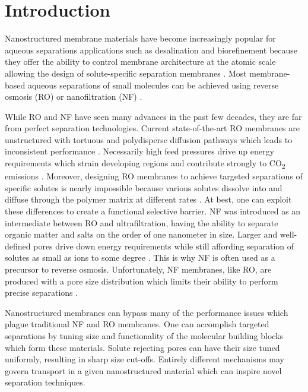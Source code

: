 \section*{Introduction}

Nanostructured membrane materials have become increasingly popular for 
aqueous separations applications such as desalination and biorefinement
because they offer the ability to control membrane architecture at the
atomic scale allowing the design of solute-specific separation membranes 
\cite{humplik_nanostructured_2011}. Most membrane-based aqueous 
separations of small molecules can be achieved using reverse osmosis 
(RO) or nanofiltration (NF) \cite{van_der_bruggen_review_2003}. 

While RO and NF have seen many advances in the past few decades, they 
are far from perfect separation technologies. Current state-of-the-art
RO membranes are unstructured with tortuous and polydisperse diffusion
pathways which leads to inconsistent performance \cite{song_nano_2011}.
Necessarily high feed pressures drive up energy requirements which 
strain developing regions and contribute strongly to CO\textsubscript{2} 
emissions \cite{mcginnis_global_2008}. Moreover, designing RO 
membranes to achieve targeted separations of specific solutes is nearly
impossible because various solutes dissolve into and diffuse through the polymer
matrix at different rates \cite{wijmans_solution-diffusion_1995}. At best,
one can exploit these differences to create a functional selective 
barrier. NF was introduced as an intermediate between RO and 
ultrafiltration, having the ability to separate organic matter and salts
on the order of one nanometer in size. Larger and well-defined pores 
drive down energy requirements while still affording separation of 
solutes as small as ions to some degree \cite{van_der_bruggen_review_2003}.
This is why NF is often used as a precursor to reverse osmosis. 
Unfortunately, NF membranes, like RO, are produced with a pore size 
distribution which limits their ability to perform precise separations
\cite{bowen_modelling_2002}.

Nanostructured membranes can bypass many of the performance issues which
plague traditional NF and RO membranes. One can accomplish targeted
separations by tuning size and functionality of the molecular building
blocks which form these materials. Solute rejecting pores can have their  %
size tuned uniformly, resulting in sharp size cut-offs. Entirely different
mechanisms may govern transport in a given nanostructured material which
can inspire novel separation techniques.

